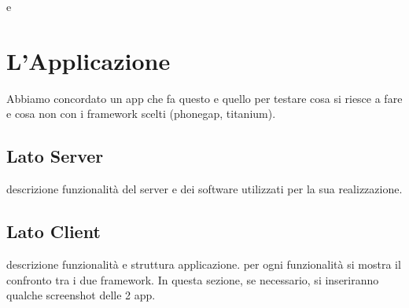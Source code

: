 e\chapter{L'Applicazione}
	Abbiamo concordato un app che fa questo e quello per testare cosa si riesce
	a fare e cosa non con i framework scelti (phonegap, titanium).
	
	\section{Lato Server}
		descrizione funzionalità del server e dei software utilizzati per la sua
		realizzazione.
	
	\section{Lato Client}
		descrizione funzionalità e struttura applicazione. per ogni funzionalità
		si mostra il confronto tra i due framework. In questa sezione, se 
		necessario, si inseriranno qualche screenshot delle 2 app.
